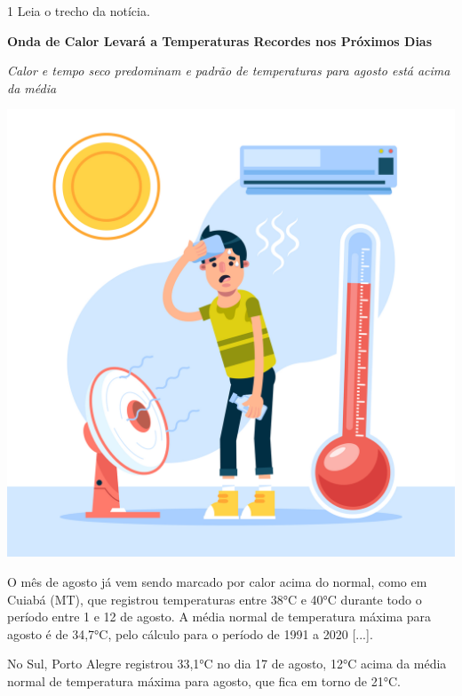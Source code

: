 
\pagebreak 

\num{1} Leia o trecho da notícia.

\begin{myquote}
\textbf{Onda de Calor Levará a Temperaturas Recordes nos Próximos Dias}

\textit{Calor e tempo seco predominam e padrão de temperaturas para agosto está acima da média}

\begin{center}
\includegraphics[width=.6\textwidth]{media/image36b.jpeg}
\end{center}

O mês de agosto já vem sendo marcado por calor acima do normal, como em Cuiabá (MT), que registrou temperaturas entre 38°C e 40°C durante todo o período entre 1 e 12 de agosto. A média normal de temperatura máxima para agosto é de 34,7°C, pelo cálculo para o período de 1991 a 2020 [...].

No Sul, Porto Alegre registrou 33,1°C no dia 17 de agosto, 12°C acima da média normal de temperatura máxima para agosto, que fica em torno de 21°C.

\end{myquote}



